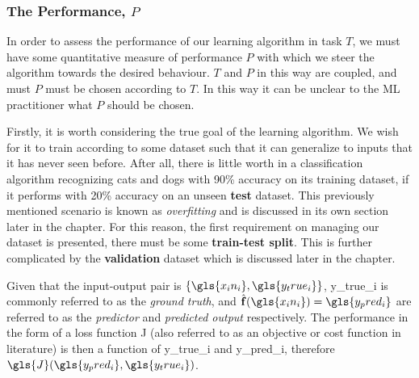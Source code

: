 

\subsubsection{The Performance, $P$\label{sec:ML-performance}}
In order to assess the performance of our learning algorithm in task $T$,
we must have some quantitative measure of performance $P$ with which we steer
the algorithm towards the desired behaviour. $T$ and $P$ in this way are
coupled, and must $P$ must be chosen according to $T$. In this way it can be
unclear to the \gls{ML} practitioner what $P$ should be chosen.

Firstly, it is worth considering the true goal of the learning algorithm. We
wish for it to train according to some dataset such that it can generalize to
inputs that it has never seen before. After all, there is little worth in a
classification algorithm recognizing cats and dogs with 90\% accuracy on its
training dataset, if it performs with 20\% accuracy on an unseen \textbf{test}
dataset. This previously mentioned scenario is known as \textit{overfitting} and
is discussed in its own section later in the chapter. For this reason, the first
requirement on managing our dataset is presented, there must be some
\textbf{train-test split}. This is further complicated by the
\textbf{validation} dataset which is discussed later in the chapter.

Given that the input-output pair is $\{\gls{x_in_i}, \gls{y_true_i}\}$,
\gls{y_true_i} is commonly referred to as the \textit{ground truth}, and
$\hat{\mathbf{f}}(\gls{x_in_i})=\gls{y_pred_i}$ are referred to as the
\textit{predictor} and \textit{predicted output} respectively. The performance
in the form of a loss function \gls{J} (also referred to as an objective or cost
function in literature) is then a function of \gls{y_true_i} and
\gls{y_pred_i}, therefore $\gls{J}(\gls{y_pred_i}, \gls{y_true_i})$.

